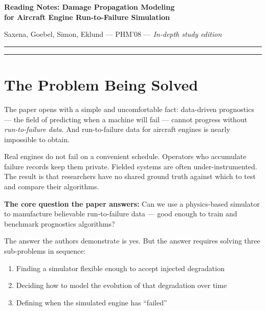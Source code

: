 \documentclass[11pt, a4paper]{article}
\begin{document}

{\Large\bfseries Reading Notes: Damage Propagation Modeling\\
for Aircraft Engine Run-to-Failure Simulation}

\smallskip
{\small Saxena, Goebel, Simon, Eklund \quad --- \quad PHM'08 \quad --- \quad
\textit{In-depth study edition}}

\medskip\hrule

\tableofcontents

\bigskip\hrule\bigskip

\section{The Problem Being Solved}

The paper opens with a simple and uncomfortable fact: data-driven prognostics
--- the field of predicting when a machine will fail --- cannot progress without
\emph{run-to-failure data}. And run-to-failure data for aircraft engines is
nearly impossible to obtain.

Real engines do not fail on a convenient schedule. Operators who accumulate
failure records keep them private. Fielded systems are often under-instrumented.
The result is that researchers have no shared ground truth against which to
test and compare their algorithms.

\begin{keybox}
\textbf{The core question the paper answers:}
Can we use a physics-based simulator to manufacture believable run-to-failure
data --- good enough to train and benchmark prognostics algorithms?
\end{keybox}

The answer the authors demonstrate is yes. But the answer requires solving
three sub-problems in sequence:

\begin{enumerate}[noitemsep]
  \item Finding a simulator flexible enough to accept injected degradation
  \item Deciding how to model the evolution of that degradation over time
  \item Defining when the simulated engine has ``failed''
\end{enumerate}
\end{document}
